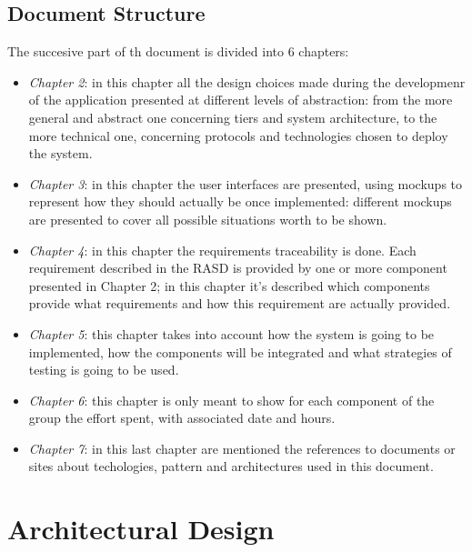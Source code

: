 \documentclass[a4paper]{report}
\begin{document}
\section{Document Structure}
The succesive part of th document is divided into 6 chapters:
\begin{itemize}
\item \textit{Chapter 2}: in this chapter all the design choices made during the developmenr of the application presented at different levels of abstraction: from the more general and abstract one concerning tiers and system architecture, to the more technical one, concerning protocols and technologies chosen to deploy the system.
\item \textit{Chapter 3}: in this chapter the user interfaces are presented, using mockups to represent how they should actually be once implemented: different mockups are presented to cover all possible situations worth to be shown.
\item \textit{Chapter 4}: in this chapter the requirements traceability is done. Each requirement described in the RASD is provided by one or more component presented in Chapter 2; in this chapter it's described which components provide what requirements and how this requirement are actually provided.
\item \textit{Chapter 5}: this chapter takes into account how the system is going to be implemented, how the components will be integrated and what strategies of testing is going to be used.
\item \textit{Chapter 6}: this chapter is only meant to show for each component of the group the effort spent, with associated date and hours.
\item \textit{Chapter 7}: in this last chapter are mentioned the references to documents or sites about techologies, pattern and architectures used in this document.

\end{itemize}
\chapter{Architectural Design}
\end{document}
